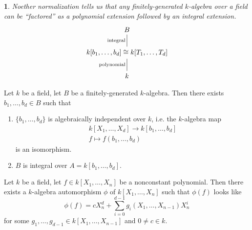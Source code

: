 \documentclass[12pt]{article}
\newtheorem{para}[theorem]{}
\begin{document}
\begin{para}
	Noether normalization tells us that any finitely-generated $k$-algebra over a field can be ``factored'' as a polynomial extension followed by an integral extension.
	\begin{equation*}
\begin{tikzcd}
B                                                                              \\
{k[b_1,\dots,b_d]\cong k[T_1,\dots,T_d]} \arrow[u, "\text{integral}", no head] \\
k \arrow[u, "\text{polynomial}", no head]                                     
\end{tikzcd}
	\end{equation*}
\end{para}

\begin{theorem}[Noether]
	Let $k$ be a field, let $B$ be a finitely-generated $k$-algebra. Then there exists $b_1,\dots, b_d\in B$ such that 
	\begin{enumerate}
		\item $\{b_1,\dots,b_d\}$ is algebraically independent over $k$, i.e. the $k$-algebra map 
			\begin{gather*}
				k[X_1,\dots, X_d] \to k[b_1,\dots,b_d] \\
				f \mapsto f(b_1,\dots, b_d)
			\end{gather*}
			is an isomorphism.
		\item $B$ is integral over $A=k[b_1,\dots,b_d]$.
	\end{enumerate}
\end{theorem}

\begin{lemma}[Nagata]
	Let $k$ be a field, let $f\in k[X_1,\dots,X_n]$ be a nonconstant polynomial. Then there exists a $k$-algebra automorphism $\phi$ of $k[X_1,\dots,X_n]$ such that $\phi(f)$ looks like 
	\begin{equation*}
		\phi(f) = cX^d_n + \sum_{i=0}^{d-1}g_i(X_1,\dots,X_{n-1})X_n^i 
	\end{equation*}
	for some $g_1,\dots,g_{d-1}\in k[X_1,\dots,X_{n-1}]$ and $0\neq c\in k$.  
\end{lemma}
\end{document}
